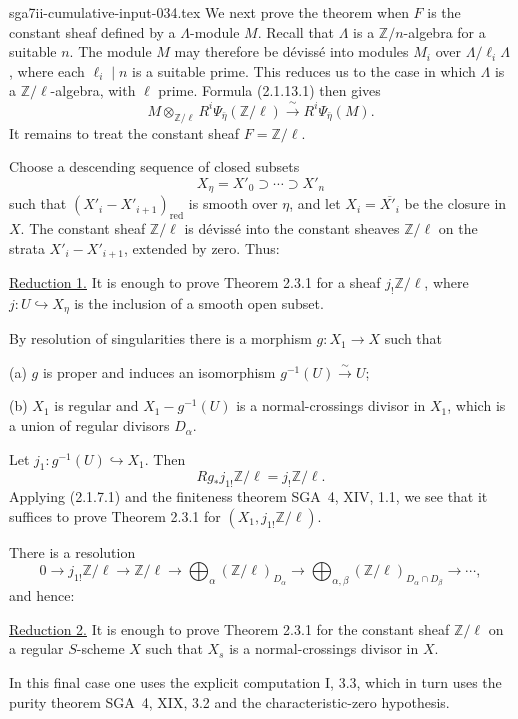 \begin{filecontents*}{sga7ii-cumulative-input-034.tex}
We next prove the theorem when $F$ is the constant sheaf defined by a
$\Lambda$-module $M$.  Recall that $\Lambda$ is a
$\mathbb Z/n$-algebra for a suitable $n$.  The module $M$ may
therefore be d\'{e}viss\'{e} into modules $M_i$ over
$\Lambda/\ell_i\Lambda$, where each $\ell_i\mid n$ is a suitable
prime.  This reduces us to the case in which $\Lambda$ is a
$\mathbb Z/\ell$-algebra, with $\ell$ prime.  Formula (2.1.13.1) then
gives
\[
M\otimes_{\mathbb Z/\ell}
R^i\Psi_{\bar\eta}(\mathbb Z/\ell)
\xrightarrow{\ \sim\ }
R^i\Psi_{\bar\eta}(M).
\]
It remains to treat the constant sheaf $F=\mathbb Z/\ell$.

Choose a descending sequence of closed subsets
\[
X_\eta=X'_0\supset\cdots\supset X'_n
\]
such that $(X'_i-X'_{i+1})_{\mathrm{red}}$ is smooth over $\eta$, and
let $X_i=\overline{X'_i}$ be the closure in $X$.  The constant sheaf
$\mathbb Z/\ell$ is d\'{e}viss\'{e} into the constant sheaves
$\mathbb Z/\ell$ on the strata $X'_i-X'_{i+1}$, extended by zero.
Thus:

\medskip
\noindent\underline{Reduction 1.}
It is enough to prove Theorem 2.3.1 for a sheaf
$j_!\mathbb Z/\ell$, where
$j:U\hookrightarrow X_\eta$ is the inclusion of a smooth open subset.

By resolution of singularities there is a morphism
$g:X_1\longrightarrow X$ such that

\medskip
\noindent(a) $g$ is proper and induces an isomorphism
$g^{-1}(U)\xrightarrow{\sim}U$;

\noindent(b) $X_1$ is regular and $X_1-g^{-1}(U)$ is a
normal-crossings divisor in $X_1$, which is a union of regular
divisors $D_\alpha$.

Let $j_1:g^{-1}(U)\hookrightarrow X_1$.  Then
\[
Rg_*j_{1!}\mathbb Z/\ell=j_!\mathbb Z/\ell.
\]
Applying (2.1.7.1) and the finiteness theorem SGA~4, XIV, 1.1, we see
that it suffices to prove Theorem 2.3.1 for
$(X_1,j_{1!}\mathbb Z/\ell)$.

There is a resolution
\[
0\longrightarrow j_{1!}\mathbb Z/\ell
\longrightarrow\mathbb Z/\ell
\longrightarrow\bigoplus_\alpha(\mathbb Z/\ell)_{D_\alpha}
\longrightarrow
\bigoplus_{\alpha,\beta}
(\mathbb Z/\ell)_{D_\alpha\cap D_\beta}
\longrightarrow\cdots,
\]
and hence:

\medskip
\noindent\underline{Reduction 2.}
It is enough to prove Theorem 2.3.1 for the constant sheaf
$\mathbb Z/\ell$ on a regular $S$-scheme $X$ such that $X_s$ is a
normal-crossings divisor in $X$.

In this final case one uses the explicit computation I, 3.3, which in
turn uses the purity theorem SGA~4, XIX, 3.2 and the characteristic-zero
hypothesis.
\end{filecontents*}
